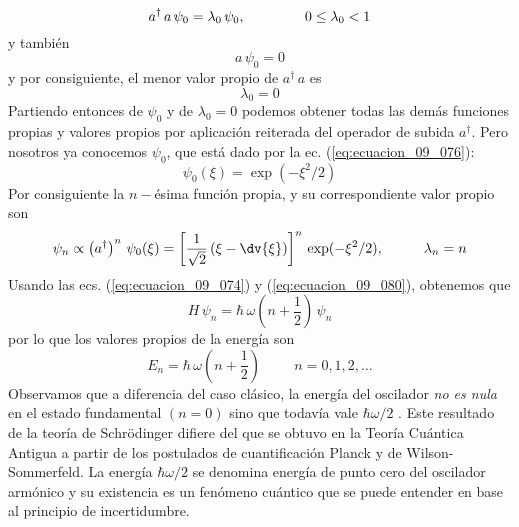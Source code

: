 {\begin{equation}
a^{\dagger} \, a \, \psi_{0} = \lambda_{0} \, \psi_{0}, \hspace{1.5cm} 0 \leq \lambda_{0} < 1
\label{eq:ecuacion_09_087}
\end{equation}
y también
\begin{equation}
a \, \psi_{0} = 0
\label{eq:ecuacion_09_088}
\end{equation}
y por consiguiente, el menor valor propio de $a^{\dagger} \, a$ es
\begin{equation}
\lambda_{0} = 0
\label{eq:ecuacion_09_089}
\end{equation}
Partiendo entonces de $\psi_{0}$ y de $\lambda_{0} = 0$ podemos obtener todas las demás funciones propias y valores propios por aplicación reiterada del operador de subida $a^{\dagger}$. Pero nosotros ya conocemos $\psi_{0}$, que está dado por la ec. (\ref{eq:ecuacion_09_076}):
\begin{equation}
\psi_{0} (\xi) = \exp(- \xi^{2}/2) 
\label{eq:ecuacion_09_090}
\end{equation}
Por consiguiente la $n-$ésima función propia, y su correspondiente valor propio son
\begin{equation}
\psi_{n} \propto \left( a^{\dagger} \right)^{n} \, \psi_{0} (\xi) = \left[ \dfrac{1}{\sqrt{2}} \left( \xi - \dv{\xi} \right) \right]^{n} \, \exp(-\xi^{2}/2), \hspace{1cm} \lambda_{n} = n
\label{eq:ecuacion_09_091}
\end{equation}
Usando las ecs. (\ref{eq:ecuacion_09_074}) y (\ref{eq:ecuacion_09_080}), obtenemos que
\begin{equation}
H \, \psi_{n} = \hbar \, \omega (n + \dfrac{1}{2}) \, \psi_{n}
\label{eq:ecuacion_09_092}
\end{equation}
por lo que los valores propios de la energía son
\begin{equation}
E_{n} = \hbar \, \omega (n + \dfrac{1}{2}) \hspace{1cm} n = 0, 1, 2, \ldots
\label{eq:ecuacion_09_093}
\end{equation}
Observamos que a diferencia del caso clásico, la energía del oscilador \emph{no es nula} en el estado fundamental $(n = 0)$ sino que todavía vale $\hbar \omega / 2$ . Este resultado de la teoría de Schrödinger difiere del que se obtuvo en la Teoría Cuántica Antigua a partir de los postulados de cuantificación Planck y de Wilson-Sommerfeld. La energía $\hbar \omega / 2$ se denomina energía de punto cero del oscilador armónico y su existencia es un fenómeno cuántico que se puede entender en base al principio de incertidumbre.

}
